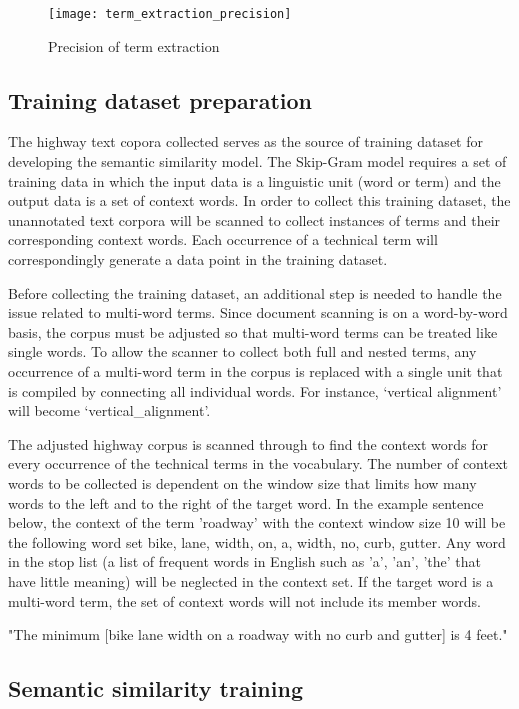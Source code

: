 \documentclass[Journal, InsideFigs, DoubleSpace]{ascelike} %
\begin{document}
\begin{figure}[t]
	\centering
	\texttt{[image: term\_extraction\_precision]}
	\caption{Precision of term extraction}
	\label{fig:term_precision}
\end{figure}

\subsection{Training dataset preparation}
The highway text copora collected serves as the source of training dataset for developing the semantic similarity model. The Skip-Gram model requires a set of training data in which the input data is a linguistic unit (word or term) and the output data is a set of context words. In order to collect this training dataset, the unannotated text corpora will be scanned to collect instances of terms and their corresponding context words. Each occurrence of a technical term will correspondingly generate a data point in the training dataset.
\par
Before collecting the training dataset, an additional step is needed to handle the issue related to multi-word terms. Since document scanning is on a word-by-word basis, the corpus must be adjusted so that multi-word terms can be treated like single words. To allow the scanner to collect both full and nested terms, any occurrence of a multi-word term in the corpus is replaced with a single unit that is compiled by connecting all individual words. For instance, ‘vertical alignment’ will become ‘vertical\_alignment’.
%
\par
The adjusted highway corpus is scanned through to find the context words for every occurrence of the technical terms in the vocabulary. The number of context words to be collected is dependent on the window size that limits how many words to the left and to the right of the target word. In the example sentence below, the context of the term 'roadway' with the context window size 10 will be the following word set {bike, lane, width, on, a, width, no, curb, gutter}. Any word in the stop list (a list of frequent words in English such as 'a', 'an', 'the' that have little meaning) will be neglected in the context set. If the target word is a multi-word term, the set of context words will not include its member words. 
%
\begin{center}
	"The minimum [bike lane width on a roadway with no curb and gutter] is 4 feet."
\end{center}
%
\subsection{Semantic similarity training}
\end{document}
